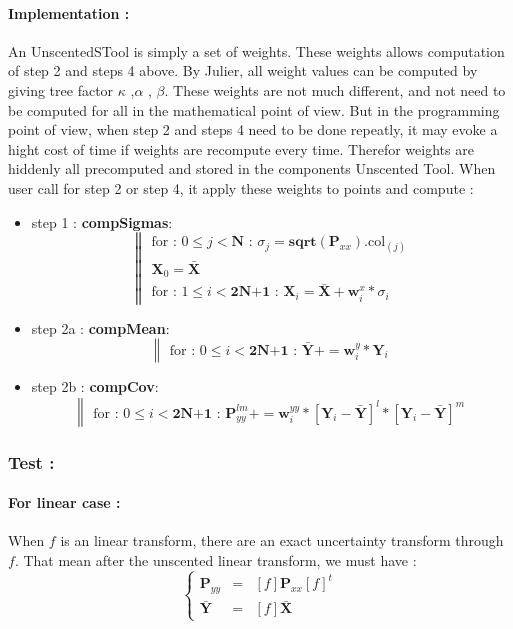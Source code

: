 \documentclass[a4paper,10pt]{article}
\begin{document}
\paragraph{Implementation : } An UnscentedSTool is simply a set of weights.
These weights allows computation of step 2 and steps 4 above. By Julier, all
weight values can be computed by giving tree factor $\kappa$ ,$\alpha$ ,
$\beta$. These weights are not much different, and not need to be computed for all in the mathematical point of view. But in the programming point of view, when step 2 and steps 4 need to be done repeatly, it may evoke a hight cost of time if weights are recompute every time. Therefor weights are hiddenly all precomputed and stored in the components Unscented Tool. When user call for step 2 or step 4, it apply these weights to points and compute :
\begin{itemize}
 \item  step 1 : \textbf{compSigmas}:
      \[
      \left\| 
      \begin{array}{l}
	    \text{for : } 0\leq j < \textbf{N} \textbf{ : } \sigma_j = \textbf{sqrt}(\textbf{P}_{xx}).\text{col}_{(j)}\\
	    \textbf{X}_0 = \bar{\textbf{X}} \\
	    \text{for : } 1\leq i < \textbf{2N+1} \textbf{ : } \textbf{X}_i = \bar{\textbf{X}}+ \textbf{w}^{x}_{i}*\sigma_i
      \end{array}\right.
      \]
 \item  step 2a : \textbf{compMean}:
      \[
      \left\| 
      \begin{array}{l}
	    \text{for : } 0\leq i < \textbf{2N+1} \textbf{ : } \bar{\textbf{Y}} += \textbf{w}^{y}_{i}*\textbf{Y}_i
      \end{array}\right.
      \]
 \item  step 2b : \textbf{compCov}:
      \[
      \left\| 
      \begin{array}{l}
	    \text{for : } 0\leq i < \textbf{2N+1} \textbf{ : } \textbf{P}^{lm}_{yy} += \textbf{w}^{yy}_{i}*\left[\textbf{Y}_i - \bar{\textbf{Y}} \right]^{l}  * \left[\textbf{Y}_i - \bar{\textbf{Y}} \right]^{m}
      \end{array}\right.
      \]
\end{itemize}
\subsubsection{Test : }
\paragraph{For linear case : }
When $f$ is an linear transform, there are an exact uncertainty transform through $f$. That mean after the unscented linear transform, we must have :
\[
\left\{ 
\begin{array}{ccl}
     \textbf{P}_{yy}  &=& \left[f\right]\textbf{P}_{xx}\left[f\right]^t  \\
     \bar{\textbf{Y}} &=& \left[f\right]\bar{\textbf{X}} 
\end{array}\right.
\]
\end{document}
